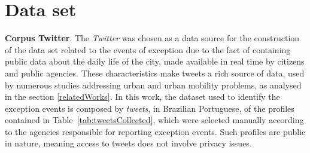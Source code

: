 \documentclass[runningheads]{llncs}
\begin{document}

\section{Data set}
\label{dataSet}
\textbf{Corpus Twitter}. The \textit{Twitter} was chosen as a data source for the construction of the data set related to the events of exception due to the fact of containing public data about the daily life of the city, made available in real time by citizens and public agencies. These characteristics make tweets a rich source of data, used by numerous studies addressing urban and urban mobility problems, as analysed in the section \ref{relatedWorks}. In this work, the dataset used to identify the exception events is composed by \textit{tweets}, in Brazilian Portuguese, of the profiles contained in Table~\ref{tab:tweetsCollected}, which were selected manually according to the agencies responsible for reporting exception events. Such profiles are public in nature, meaning access to tweets does not involve privacy issues.
\end{document}
